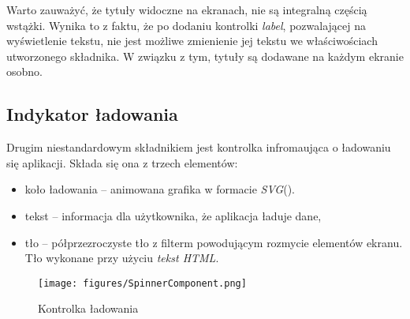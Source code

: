 Warto zauważyć, że tytuły widoczne na ekranach, nie są integralną częścią wstążki. Wynika to z faktu, że po dodaniu kontrolki \emph{label}, pozwalającej na wyświetlenie tekstu, nie jest możliwe zmienienie jej  tekstu we właściwościach utworzonego składnika. W związku z tym, tytuły są dodawane na każdym ekranie osobno.

\subsection{Indykator ładowania}
Drugim niestandardowym składnikiem jest kontrolka infromaująca o ładowaniu się aplikacji. Składa się ona z trzech elementów:
\begin{itemize}
    \item koło ładowania -- animowana grafika w formacie \emph{SVG}().
    \item tekst -- informacja dla użytkownika, że aplikacja ładuje dane,
        \item tło -- półprzezroczyste tło z filterm powodującym rozmycie elementów ekranu. Tło wykonane przy użyciu \emph{tekst HTML}.
\end{itemize}

\begin{figure}[t]
    \centering
    \texttt{[image: figures/SpinnerComponent.png]}
    \caption{Kontrolka ładowania} 
    \label{fig:spinnercomponent}
    \end{figure}

